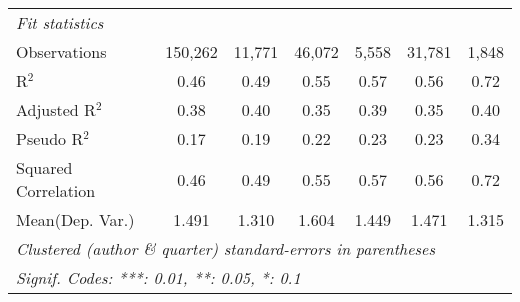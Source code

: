 \begin{tabular}{lcccccc}
   \midrule
   \emph{Fit statistics}\\
   Observations                                               & 150,262       & 11,771  & 46,072       & 5,558         & 31,781        & 1,848\\  
   R$^2$                                                      & 0.46          & 0.49    & 0.55         & 0.57          & 0.56          & 0.72\\  
   Adjusted R$^2$                                             & 0.38          & 0.40    & 0.35         & 0.39          & 0.35          & 0.40\\  
   Pseudo R$^2$                                               & 0.17          & 0.19    & 0.22         & 0.23          & 0.23          & 0.34\\  
   Squared Correlation                                        & 0.46          & 0.49    & 0.55         & 0.57          & 0.56          & 0.72\\  
Mean(Dep. Var.) & 1.491 & 1.310 & 1.604 & 1.449 & 1.471 & 1.315 \\
   \midrule \midrule
   \multicolumn{7}{l}{\emph{Clustered (author \& quarter) standard-errors in parentheses}}\\
   \multicolumn{7}{l}{\emph{Signif. Codes: ***: 0.01, **: 0.05, *: 0.1}}\\
\end{tabular}
\par\endgroup
